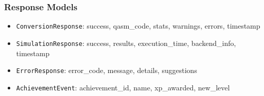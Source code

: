 \subsubsection{Response Models}
\begin{itemize}
    \item \texttt{ConversionResponse}: success, qasm\_code, stats, warnings, errors, timestamp
    \item \texttt{SimulationResponse}: success, results, execution\_time, backend\_info, timestamp
    \item \texttt{ErrorResponse}: error\_code, message, details, suggestions
    \item \texttt{AchievementEvent}: achievement\_id, name, xp\_awarded, new\_level
\end{itemize}
